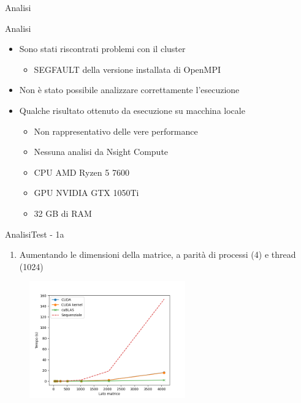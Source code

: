 \begin{frame}
    \centering \Huge
    Analisi
\end{frame}

\begin{frame}{Analisi}
    \begin{itemize}
        \item Sono stati riscontrati problemi con il cluster
              \begin{itemize}
                  \item SEGFAULT della versione installata di OpenMPI
              \end{itemize}
        \item Non è stato possibile analizzare correttamente l'esecuzione
        \item Qualche risultato ottenuto da esecuzione su macchina locale
              \begin{itemize}
                  \item Non rappresentativo delle vere performance
                  \item Nessuna analisi da Nsight Compute
                  \item CPU AMD Ryzen 5 7600
                  \item GPU NVIDIA GTX 1050Ti
                  \item 32 GB di RAM
              \end{itemize}
    \end{itemize}
\end{frame}

\begin{frame}{Analisi}{Test - 1a}
    \begin{enumerate}
        \item[1a] Aumentando le dimensioni della matrice, a parità di processi (4) e thread (1024)
    \end{enumerate}

    \begin{figure}[H]
        \centering
        \includegraphics[width=0.6\textwidth]{./imgs/graphs/caso_0.png}
    \end{figure}
\end{frame}

